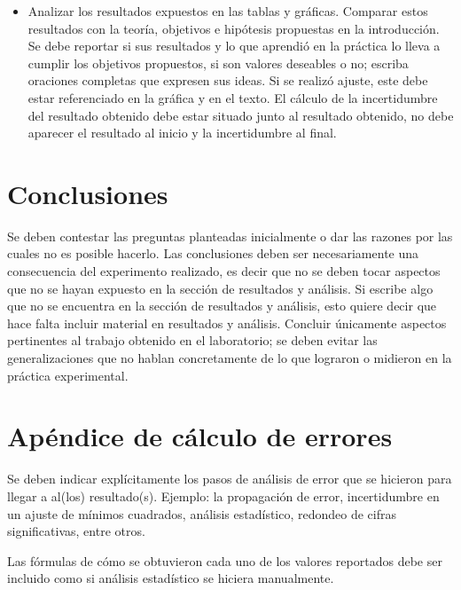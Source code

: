 \begin{itemize}
    \item Analizar los resultados expuestos en las tablas y gráficas. Comparar estos resultados con la teoría, objetivos e hipótesis propuestas en la introducción. Se debe reportar si sus resultados y lo que aprendió en la práctica lo lleva a cumplir los objetivos propuestos, si son valores deseables o no; escriba oraciones completas que expresen sus ideas. Si se realizó ajuste, este debe estar referenciado en la gráfica y en el texto. El cálculo de la incertidumbre del resultado obtenido debe estar situado junto al resultado obtenido, no debe aparecer el resultado al inicio y la incertidumbre al final.

\end{itemize}





\section{Conclusiones}

Se deben contestar las preguntas planteadas inicialmente o dar las razones por las cuales no es posible hacerlo. Las conclusiones deben ser necesariamente una consecuencia del experimento realizado, es  decir  que  no  se  deben  tocar  aspectos  que  no  se  hayan  expuesto  en  la  sección  de resultados y análisis. Si escribe algo que no se encuentra en la sección de resultados y análisis,  esto quiere decir que hace falta incluir material en resultados y análisis. Concluir únicamente aspectos pertinentes al trabajo obtenido en el laboratorio; se deben evitar las generalizaciones que no hablan concretamente de lo que lograron o midieron en la práctica experimental. 





\nocite{Ejemplo}

\section*{Apéndice de cálculo de errores}

Se deben indicar explícitamente los pasos de análisis de error que se hicieron para llegar a al(los) resultado(s). Ejemplo: la propagación de error, incertidumbre en un ajuste de mínimos cuadrados, análisis estadístico, redondeo de cifras significativas, entre otros.

Las fórmulas de cómo se obtuvieron cada uno de los valores reportados debe ser incluido como si análisis estadístico se hiciera manualmente.


